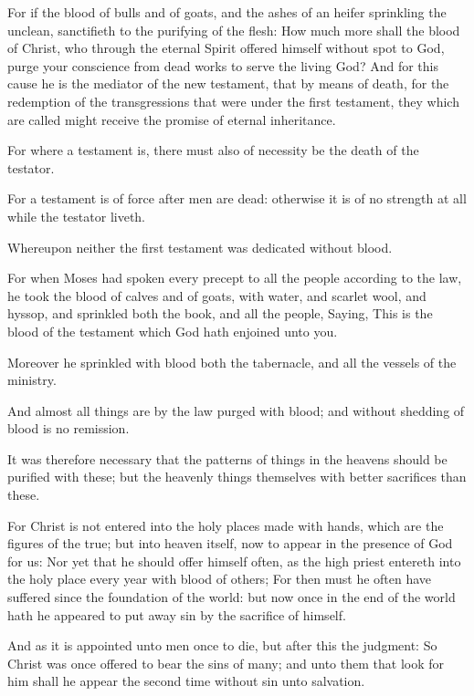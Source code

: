 \verse For if the blood of bulls and of goats, and the ashes of an heifer sprinkling the unclean, sanctifieth to the purifying of the flesh: \verse How much more shall the blood of Christ, who through the eternal Spirit offered himself without spot to God, purge your conscience from dead works to serve the living God?  \verse And for this cause he is the mediator of the new testament, that by means of death, for the redemption of the transgressions that were under the first testament, they which are called might receive the promise of eternal inheritance.

\verse For where a testament is, there must also of necessity be the death of the testator.

\verse For a testament is of force after men are dead: otherwise it is of no strength at all while the testator liveth.

\verse Whereupon neither the first testament was dedicated without blood.

\verse For when Moses had spoken every precept to all the people according to the law, he took the blood of calves and of goats, with water, and scarlet wool, and hyssop, and sprinkled both the book, and all the people, \verse Saying, This is the blood of the testament which God hath enjoined unto you.

\verse Moreover he sprinkled with blood both the tabernacle, and all the vessels of the ministry.

\verse And almost all things are by the law purged with blood; and without shedding of blood is no remission.

\verse It was therefore necessary that the patterns of things in the heavens should be purified with these; but the heavenly things themselves with better sacrifices than these.

\verse For Christ is not entered into the holy places made with hands, which are the figures of the true; but into heaven itself, now to appear in the presence of God for us: \verse Nor yet that he should offer himself often, as the high priest entereth into the holy place every year with blood of others; \verse For then must he often have suffered since the foundation of the world: but now once in the end of the world hath he appeared to put away sin by the sacrifice of himself.

\verse And as it is appointed unto men once to die, but after this the judgment: \verse So Christ was once offered to bear the sins of many; and unto them that look for him shall he appear the second time without sin unto salvation.


